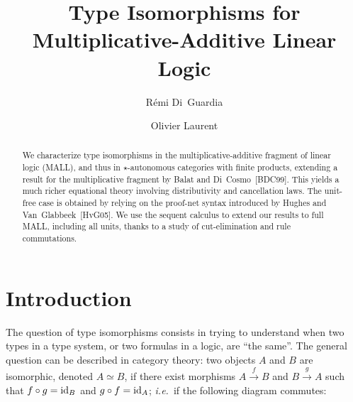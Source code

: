 \documentclass{lmcs}
\newcommand*{\ie}{\emph{i.e.}}
\newcommand*{\iso}{\mathrel{\simeq}} %
\newcommand*{\id}[1]{\ensuremath{\textnormal{id}_{#1}}}
\begin{document}
\title[Type Isomorphisms for Multiplicative-Additive Linear Logic]{Type Isomorphisms for\texorpdfstring{\\}{ }Multiplicative-Additive Linear Logic}

\author[R.~{Di~Guardia}]{R\'emi {Di~Guardia}}
\author[O.~Laurent]{Olivier Laurent}
\address{Univ Lyon, EnsL, UCBL, CNRS, LIP, F-69342, LYON Cedex 07, France}


\begin{abstract}
\noindent
We characterize type isomorphisms in the multiplicative-additive fragment of linear logic (MALL), and thus in $\star$-autonomous categories with finite products, extending a result for the multiplicative fragment by Balat and Di~Cosmo~[BDC99].
This yields a much richer equational theory involving distributivity and cancellation laws.
The unit-free case is obtained by relying on the proof-net syntax introduced by Hughes and Van~Glabbeek~[HvG05].
We use the sequent calculus to extend our results to full MALL, including all units, thanks to a study of cut-elimination and rule commutations.
\end{abstract}

\maketitle


\section{Introduction}
\label{sec:intro}

The question of type isomorphisms consists in trying to understand when two types in a type system, or two formulas in a logic, are ``the same''.
The general question can be described in category theory: two objects $A$ and $B$ are isomorphic, denoted $A \iso B$, if there exist morphisms $A\overset{f}{\longrightarrow} B$ and $B\overset{g}{\longrightarrow} A$ such that $f\circ g=\id{B}$ and $g\circ f=\id{A}$; \ie\ if the following diagram commutes:
\end{document}

